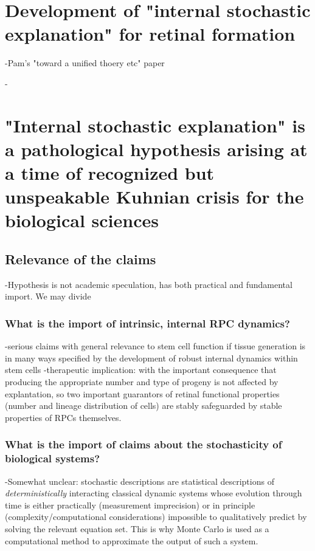 \section{Development of "internal stochastic explanation" for retinal formation}

-Pam's "toward a unified thoery etc" paper

-

\section{"Internal stochastic explanation" is a pathological hypothesis arising at a time of recognized but unspeakable Kuhnian crisis for the biological sciences}

\subsection{Relevance of the claims}

-Hypothesis is not academic speculation, has both practical and fundamental import. We may divide

\subsubsection{What is the import of intrinsic, internal RPC dynamics?}

-serious claims with general relevance to stem cell function if tissue generation is in many ways specified by the development of robust internal dynamics within stem cells
-therapeutic implication: with the important consequence that producing the appropriate number and type of progeny is not affected by explantation, so two important guarantors of retinal functional properties (number and lineage distribution of cells) are stably safeguarded by stable properties of RPCs themselves.

\subsubsection{What is the import of claims about the stochasticity of biological systems?}

-Somewhat unclear: stochastic descriptions are statistical descriptions of \textit{deterministically} interacting classical dynamic systems whose evolution through time is either practically (measurement imprecision) or in principle (complexity/computational considerations) impossible to qualitatively predict by solving the relevant equation set. This is why Monte Carlo is used as a computational method to approximate the output of such a system.


